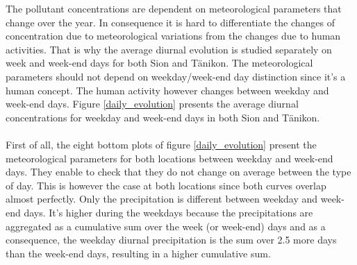 \documentclass[a4paper, 12pt]{article}
\begin{document}
    The pollutant concentrations are dependent on meteorological parameters that change over the year. In consequence it is hard to differentiate the changes of concentration due to meteorological variations from the changes due to human activities. That is why the average diurnal evolution is studied separately on week and week-end days for both Sion and Tänikon. The meteorological parameters should not depend on weekday/week-end day distinction since it's a human concept. The human activity however changes between weekday and week-end days. Figure \ref{daily_evolution} presents the average diurnal concentrations for weekday and week-end days in both Sion and Tänikon.
    \\
    \\
    First of all, the eight bottom plots of figure \ref{daily_evolution} present the meteorological parameters for both locations between weekday and week-end days. They enable to check that they do not change on average between the type of day. This is however the case at both locations since both curves overlap almost perfectly. Only the precipitation is different between weekday and week-end days. It's higher during the weekdays because the precipitations are aggregated as a cumulative sum over the week (or week-end) days and as a consequence, the weekday diurnal precipitation is the sum over 2.5 more days than the week-end days, resulting in a higher cumulative sum. 
    \\
\end{document}
